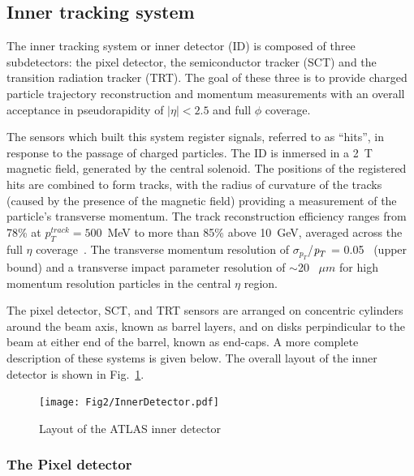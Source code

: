 \subsection{Inner tracking system}\label{sec:atlasID}

The inner tracking system or inner detector (ID) is composed of three subdetectors: the pixel detector, the semiconductor tracker (SCT) and the transition radiation tracker (TRT). The goal of these three is to provide charged particle trajectory reconstruction and momentum measurements with an overall acceptance in pseudorapidity of $|\eta| < 2.5$ and full $\phi$ coverage. 

The sensors which built this system register signals, referred to as ``hits'', in response to the passage of charged particles. The ID is inmersed in a 2~T magnetic field, generated by the central solenoid. The positions of the registered hits are combined to form tracks, with the radius of curvature  of the tracks (caused by the presence of the magnetic field) providing a measurement of the particle’s transverse momentum. The track reconstruction efficiency ranges from 78\% at $p^{track}_{T} = 500$~MeV to more than 85\% above 10~GeV, averaged across the full $\eta$ coverage~\cite{chargemultiplicity}. The transverse momentum resolution of $\sigma_{p_T}$/${\emph{p}_{T}}$ = 0.05~\cite{ATLAS-CONF-2010-009} (upper bound) and a transverse impact parameter resolution of $\sim$20~ $\mu m$ for high momentum resolution particles in the central $\eta$ region\cite{ATLAS-CONF-2010-070}. 

The pixel detector, SCT, and TRT sensors are arranged on concentric cylinders around the beam axis, known as barrel layers, and on disks perpindicular to the beam at either end of the barrel, known as end-caps. A more complete description of these systems is given below. The overall layout of the inner detector is shown in Fig.~\ref{fig:figinner}. 


\begin{figure}[htbp]
  \begin{center}
      \texttt{[image: Fig2/InnerDetector.pdf]}
    \caption{Layout of the ATLAS inner detector}
    \label{fig:figinner}
  \end{center}
\end{figure}


\subsubsection{The Pixel detector}

